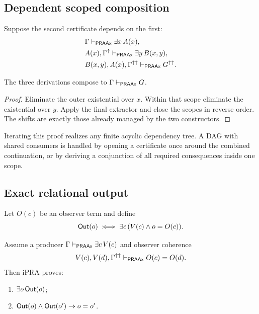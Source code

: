 \subsection{Dependent scoped composition}

Suppose the second certificate depends on the first:
\begin{align*}
 &\Gamma\mathrel{\vdash_{\mathsf{PRAAx}}}\exists x\,A(x),\\
 &A(x),\Gamma^{\mathord{\uparrow}}\mathrel{\vdash_{\mathsf{PRAAx}}}\exists y\,B(x,y),\\
 &B(x,y),A(x),\Gamma^{\mathord{\uparrow}\mathord{\uparrow}}\mathrel{\vdash_{\mathsf{PRAAx}}} G^{\mathord{\uparrow}\mathord{\uparrow}}.
\end{align*}

\begin{theorem}
\label{thm:dependent-sealing}
The three derivations compose to \(\Gamma\mathrel{\vdash_{\mathsf{PRAAx}}} G\).
\end{theorem}

\begin{proof}
Eliminate the outer existential over \(x\).  Within that scope eliminate the
existential over \(y\).  Apply the final extractor and close the scopes in
reverse order.  The shifts are exactly those already managed by the two
 constructors.
\end{proof}

Iterating this proof realizes any finite acyclic dependency tree.  A DAG with
shared consumers is handled by opening a certificate once around the combined
continuation, or by deriving a conjunction of all required consequences inside
one scope.

\subsection{Exact relational output}

Let \(O(c)\) be an observer term and define
\[
  \mathsf{Out}(o)\;:\!\Longleftrightarrow\;
    \exists c\,(V(c)\wedge o=O(c)).
\]

\begin{theorem}
\label{thm:observed-relation}
Assume a producer \(\Gamma\mathrel{\vdash_{\mathsf{PRAAx}}}\exists c\,V(c)\) and observer coherence
\[
  V(c),V(d),\Gamma^{\mathord{\uparrow}\mathord{\uparrow}}
     \mathrel{\vdash_{\mathsf{PRAAx}}} O(c)=O(d).
\]
Then iPRA proves:
\begin{enumerate}[label=(\roman*)]
\item \(\exists o\,\mathsf{Out}(o)\);
\item \(\mathsf{Out}(o)\wedge\mathsf{Out}(o')\to o=o'\).
\end{enumerate}
\end{theorem}

